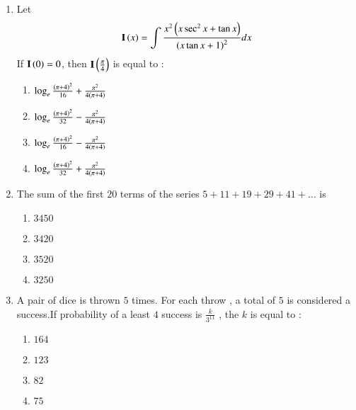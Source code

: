 \documentclass[journal,12pt,onecolumn]{IEEEtran}
\theoremstyle{remark}
\begin{document}
\begin{enumerate}
    \item Let 
    \begin{align}
        \mathbf{I}\left(x\right) = \int{\frac{x^2 \ensuremath{\left(x \sec^2 x + \tan x\right)}}{\ensuremath{\left(x \tan x +1\right)}^2}dx}
    \end{align}
    If $\mathbf{I}\left(0\right) = 0$, then $\mathbf{I}\left(\frac{\pi}{4}\right)$ is equal to :
    \begin{multicols}{2}
    \begin{enumerate}
        \item $\log_e \frac{\left(\pi +4\right)^2}{16} + \frac{\pi ^2}{4 \left(\pi + 4\right)}$\\
        \item $\log_e \frac{\left(\pi +4\right)^2}{32} - \frac{\pi ^2}{4 \left(\pi + 4\right)}$
        \item $\log_e \frac{\left(\pi +4\right)^2}{16} - \frac{\pi ^2}{4 \left(\pi + 4\right)}$\\
        \item $\log_e \frac{\left(\pi +4\right)^2}{32} + \frac{\pi ^2}{4 \left(\pi + 4\right)}$
    \end{enumerate}
    \end{multicols}
    \item The sum of the first $20$ terms of the series $ 5 + 11 + 19 + 29 + 41 + \dots $ is
    \begin{multicols}{2}
    \begin{enumerate}
        \item $3450$
        \item $3420$\\
        \item $3520$
        \item $3250$
    \end{enumerate}
    \end{multicols}
    \item A pair of dice is thrown $5$ times. For each throw , a total of $5$ is considered a success.If probability of a least $4$ success is $\frac{k}{3^{11}}$ , the $k$ is equal to :
    \begin{multicols}{2}
        \begin{enumerate}
            \item $164$
            \item $123$\\
            \item $82$
            \item $75$
        \end{enumerate}
    \end{multicols}

\end{enumerate}
\end{document}
